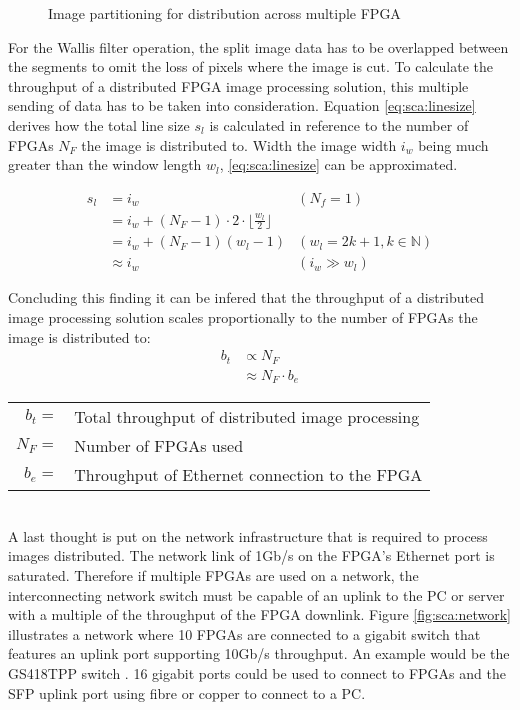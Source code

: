 \begin{figure}[b!]
    \centering
    \begin{adjustbox}{max width=\linewidth}
        
    \end{adjustbox}
    \caption{Image partitioning for distribution across multiple FPGA}
    \label{fig:sca:acrossfpgapart}
\end{figure}

For the Wallis filter operation, the split image data has to be overlapped
between the
segments to omit the loss of pixels where the image is cut. To calculate the
throughput of a distributed FPGA image processing solution, this multiple
sending of data has to be taken into consideration. Equation 
\ref{eq:sca:linesize} derives how the total line size $s_l$ is calculated in
reference to the number of FPGAs $N_F$ the image is distributed to. Width the
image width $i_w$ being much greater than the window length $w_l$, 
\ref{eq:sca:linesize} can be approximated.

\begin{align}
    s_l  & = i_w & (N_f = 1) \\
         & = i_w + (N_F-1) \cdot 2 \cdot \lfloor\frac{w_l}{2}\rfloor & \\
         & = i_w + (N_F-1)(w_l-1) & (w_l=2k+1, k \in \mathbb{N} )\\
         & \approx i_w & (i_w \gg w_l)
    \label{eq:sca:linesize}
\end{align}

Concluding this finding it can be infered that the throughput of a distributed
image processing solution scales proportionally to the number of FPGAs the image
is distributed to:
\begin{align}
    b_t & \propto N_F \\
        & \approx N_F \cdot b_e
\end{align}
\begin{tabular}{rl}
    $b_t        =$ & Total throughput of distributed image processing \\
    $N_F        =$ & Number of FPGAs used \\
    $b_e        =$ & Throughput of Ethernet connection to the FPGA \\
\end{tabular} \\

A last thought is put on the network infrastructure that is required to
process images distributed. The network link of 1Gb/s on the FPGA's Ethernet
port is saturated. Therefore if multiple FPGAs are used on a network, the
interconnecting network switch must be capable of an uplink to the PC or server
with a multiple of the throughput of the FPGA downlink. Figure 
\ref{fig:sca:network} illustrates a network where 10 FPGAs are connected to a
gigabit switch that features an uplink port supporting 10Gb/s throughput. An
example would be the GS418TPP switch \cite{netgearswitch}. 16 gigabit ports
could be used to connect to FPGAs and the SFP uplink port using fibre or copper
to connect to a PC.

